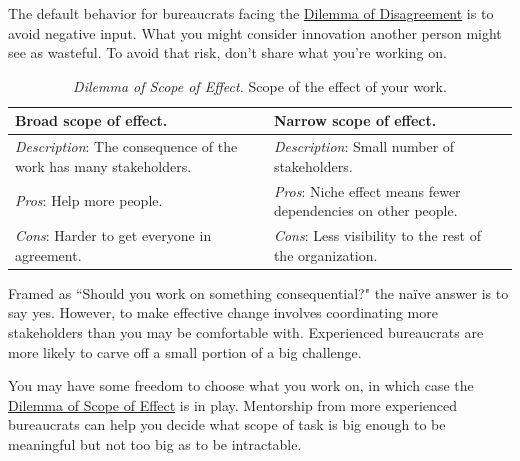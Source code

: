 %
The default behavior for bureaucrats facing the \hyperref[table:dilemma-personal-opposition-involve-ignore]{Dilemma of Disagreement} is to avoid negative input. What you might consider innovation another person might see as wasteful. To avoid that risk, don't share what you're working on.

\begin{center}
\begin{table}[H] %
\begin{tabular}{ | m{\dilemmatablewidth}| m{\dilemmatablewidth} | } 
  \hline
  \textbf{Broad scope of effect.} &
  \textbf{Narrow scope of effect.} \\
  \hline
  \textit{Description}: The consequence of the work has many stakeholders. &
  \textit{Description}: Small number of stakeholders. \\  
  \hline
  \textit{Pros}: Help more people. &
  \textit{Pros}: Niche effect means fewer dependencies on other people. \\
  \hline
  \textit{Cons}: Harder to get everyone in agreement. & 
  \textit{Cons}: Less visibility to the rest of the organization. \\
  \hline
\end{tabular}
\caption{
\textit{Dilemma of Scope of Effect.}
Scope of the effect of your work. 
}
\label{table:dilemma-personal-scope-broad-vs-narrow}
\end{table}
\end{center}

Framed as ``Should you work on something consequential?" the na\"ive answer is to say yes. However, to make effective change involves coordinating more stakeholders than you may be comfortable with. Experienced bureaucrats are more likely to carve off a small portion of a big challenge.

You may have some freedom to choose what you work on, in which case the \hyperref[table:dilemma-personal-scope-broad-vs-narrow]{Dilemma of Scope of Effect} is in play. Mentorship from more experienced bureaucrats can help you decide what scope of task is big enough to be meaningful but not too big as to be intractable.

